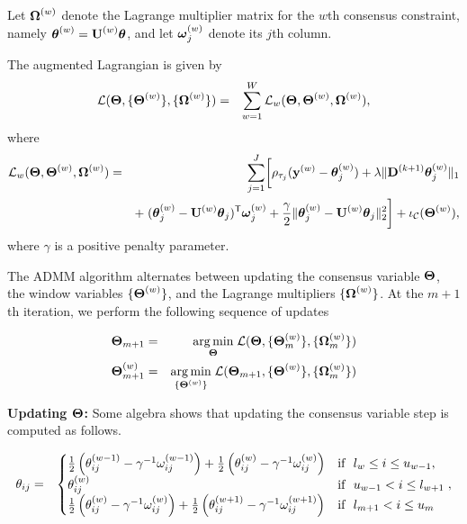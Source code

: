 \documentclass[aoas]{imsart}
\newcommand{\Tra}{^{\sf T}} %
\newcommand{\Inv}{^{-1}} %
\newcommand{\V}[1]{{\bm{\mathbf{\MakeLowercase{#1}}}}} %
\newcommand{\Vn}[2]{\V{#1}^{(#2)}} %
\newcommand{\M}[1]{{\bm{\mathbf{\MakeUppercase{#1}}}}} %
\newcommand{\ME}[2]{\MakeLowercase{#1}_{#2}} %
\newcommand{\Mn}[2]{\M{#1}^{(#2)}} %
\newcommand{\MnE}[3]{\MakeLowercase{#1}^{(#2)}_{#3}} %
\begin{document}
Let $\Mn{\Omega}{w}$ denote the Lagrange multiplier matrix for the $w$th consensus constraint, namely $\Mn{\theta}{w} = \Mn{U}{w}\M{\theta}$, and let $\Vn{\omega}{w}_{j}$ denote its $j$th column.
%

The augmented Lagrangian is given by
\begin{eqnarray*}
	\mathcal{L}(\M{\Theta}, \{\Mn{\Theta}{w}\}, \{\Mn{\Omega}{w}\}) & = & \sum_{w=1}^W \mathcal{L}_w(\M{\Theta}, \Mn{\Theta}{w}, \Mn{\Omega}{w}),
\end{eqnarray*}
where
\begin{eqnarray*}
	\mathcal{L}_w(\M{\Theta}, \Mn{\Theta}{w}, \Mn{\Omega}{w}) & = & \sum_{j=1}^J \biggl [\rho_{\tau_j}(\Vn{y}{w} - \Vn{\theta}{w}_j)+\lambda \lVert \Mn{D}{k+1}\Vn{\theta}{w}_j\rVert_1 \\
	&& + \; (\Vn{\theta}{w}_j - \Mn{U}{w}\V{\theta}_{j})\Tra\Vn{\omega}{w}_{j} +
	\frac{\gamma}{2}\lVert \Vn{\theta}{w}_j - \Mn{U}{w}\V{\theta}_{j}\rVert_2^2 \biggr ] + \iota_\mathcal{C}(\Mn{\Theta}{w}),
\end{eqnarray*}
where $\gamma$ is a positive penalty parameter.

The ADMM algorithm alternates between updating the consensus variable $\M{\Theta}$, the window variables $\{\Mn{\Theta}{w}\}$, and the Lagrange multipliers $\{\Mn{\Omega}{w}\}$.
At the $m+1$th iteration, we perform the following sequence of updates

\begin{eqnarray*}
	\M{\Theta}_{m+1} & = & \underset{\M{\Theta}}{\arg\min}\; \mathcal{L}(\M{\Theta}, \{\Mn{\Theta}{w}_m\}, \{\Mn{\Omega}{w}_m\}) \\
	\Mn{\Theta}{w}_{m+1} & = & \underset{\{\Mn{\Theta}{w}\}}{\arg\min}\; \mathcal{L}(\M{\Theta}_{m+1}, \{\Mn{\Theta}{w}\}, \{\Mn{\Omega}{w}_m\}) \\
\end{eqnarray*}

{\bf Updating $\M{\Theta}$: } Some algebra shows that updating the consensus variable step is computed as follows.

\begin{eqnarray}
\label{eq:update_consensus}
\ME{\theta}{ij}	 &=& \begin{cases}
\frac{1}{2}\left (\MnE{\theta}{w-1}{ij} - \gamma\Inv \MnE{\omega}{w-1}{ij} \right)
+
\frac{1}{2} \left (\MnE{\theta}{w}{ij} - \gamma\Inv \MnE{\omega}{w}{ij} \right)
& \mbox{if~~} l_{w} \le i \le u_{w-1},  \\
\MnE{\theta}{w}{ij} & \mbox{if~~} u_{w-1} < i \le l_{w+1}  \\
\frac{1}{2} \left ( \MnE{\theta}{w}{ij} - \gamma\Inv \MnE{\omega}{w}{ij}\right )
+
\frac{1}{2}	\left ( \MnE{\theta}{w+1}{ij} - \gamma\Inv \MnE{\omega}{w+1}{ij} \right )
& \mbox{if~~} l_{m+1} < i \le u_{m}
\end{cases},
\end{eqnarray}
\end{document}
